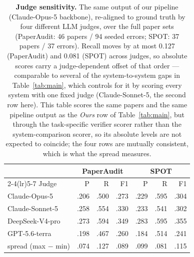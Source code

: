 \begin{table}[t]
\centering\small
\setlength{\tabcolsep}{3.5pt}
\begin{tabular}{l rrr rrr}
\toprule
& \multicolumn{3}{c}{\textbf{PaperAudit}} & \multicolumn{3}{c}{\textbf{SPOT}} \\
\cmidrule(lr){2-4}\cmidrule(lr){5-7}
Judge & P & R & F1 & P & R & F1 \\
\midrule
Claude-Opus-5 & .206 & .500 & .273 & .229 & .595 & .304 \\
Claude-Sonnet-5 & .258 & .554 & .330 & .233 & .541 & .302 \\
DeepSeek-V4-pro & .273 & .594 & .349 & .283 & .595 & .355 \\
GPT-5.6-terra & .198 & .467 & .260 & .184 & .514 & .241 \\
\midrule
spread (max $-$ min) & .074 & .127 & .089 & .099 & .081 & .115 \\
\bottomrule
\end{tabular}
\caption{\textbf{Judge sensitivity.} The same output of our pipeline (Claude-Opus-5 backbone), re-aligned to ground truth by four different LLM judges, over the full paper sets (PaperAudit: 46 papers / 94 seeded errors; SPOT: 37 papers / 37 errors). Recall moves by at most 0.127 (PaperAudit) and 0.081 (SPOT) across judges, so absolute scores carry a judge-dependent offset of that order --- comparable to several of the system-to-system gaps in Table~\ref{tab:main}, which controls for it by scoring every system with one fixed judge (Claude-Sonnet-5, the second row here). This table scores the same papers and the same pipeline output as the \emph{Ours} row of Table~\ref{tab:main}, but through the task-specific verifier scorer rather than the system-comparison scorer, so its absolute levels are not expected to coincide; the four rows are mutually consistent, which is what the spread measures.}
\label{tab:judge}
\end{table}
